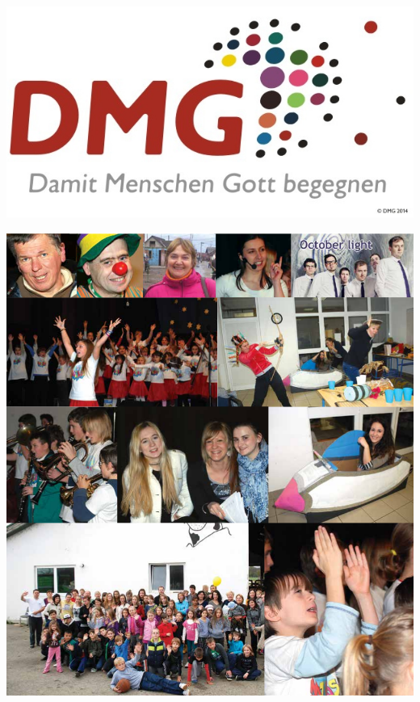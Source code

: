 \documentclass[a4paper,twoside, svgnames]{article}
\begin{document}
\begin{multicols}{2}
\begin{onehalfspacing}
\begin{justify}
\vfill

\begin{center}
\includegraphics[width=0.5\linewidth]{images/DMG_2014}
\end{center}



        \end{justify}
     \end{onehalfspacing}
\end{multicols}
\newpage
\begin{center}
\includegraphics[width=\linewidth]{images/suradnici}\\

\vfill

\end{center}
\end{document}
